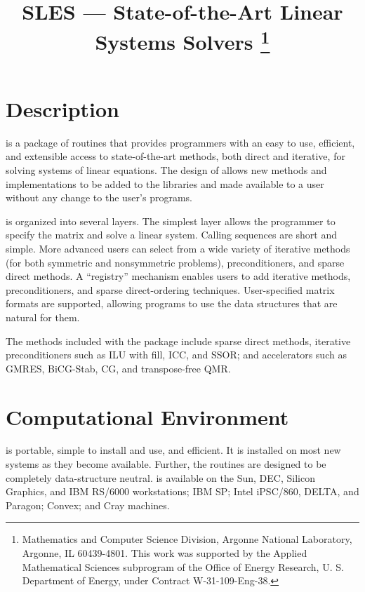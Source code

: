 \addtolength{\textheight}{2.5in}
\pagestyle{empty}

\pagestyle{empty}
\title{SLES --- State-of-the-Art Linear Systems Solvers
\thanks{Mathematics and Computer Science Division,
Argonne National Laboratory,
Argonne, IL 60439-4801.
This work was supported by the Applied Mathematical
Sciences subprogram of the Office of Energy Research, U. S. Department of
Energy, under Contract W-31-109-Eng-38.}}

\date{}
\maketitle

\section*{Description}

 is a package of routines that 
provides programmers with an easy to use, efficient, and
extensible access to state-of-the-art methods, both direct and iterative,
for solving systems of linear equations.
The design of  allows new methods and implementations to be 
added to the libraries and made available to a user without any change 
to the user's programs.  

 is organized into several layers.  
The simplest layer allows the programmer to specify the matrix and solve
a linear system.
Calling sequences are short and simple.
More advanced users can select from a wide variety of iterative methods
(for both symmetric and nonsymmetric problems), preconditioners, and
sparse direct methods.
A ``registry'' mechanism enables users to add iterative methods,
preconditioners, and sparse direct-ordering techniques.
User-specified matrix formats are supported, allowing programs to
use the data structures that are natural for them.  

The methods included with the package include sparse direct methods,
iterative preconditioners such as ILU with fill, ICC, and SSOR; and 
accelerators such as GMRES, BiCG-Stab, CG, and transpose-free QMR.

\section*{Computational Environment}
 is portable, simple to install and use, and 
efficient.
It is installed on most new systems as they become available.
Further, the routines are designed to be completely data-structure neutral.
 is available on the Sun, DEC, Silicon Graphics, and IBM
RS/6000 workstations; IBM SP; Intel iPSC/860, DELTA, and Paragon;
Convex; and Cray machines.

